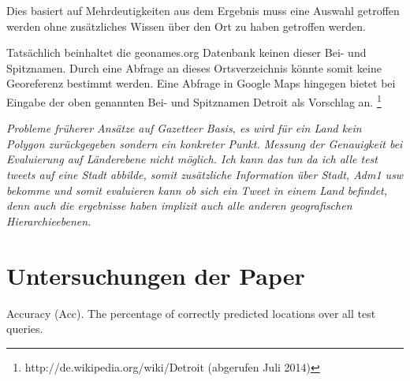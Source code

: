 		Dies basiert auf Mehrdeutigkeiten aus dem Ergebnis muss eine Auswahl getroffen werden ohne zusätzliches Wissen über den Ort zu haben getroffen werden.


		Tatsächlich beinhaltet die geonames.org Datenbank keinen dieser Bei- und Spitznamen.
		Durch eine Abfrage an dieses Ortsverzeichnis könnte somit keine Georeferenz bestimmt werden.
		Eine Abfrage in Google Maps hingegen bietet bei Eingabe der oben genannten Bei- und Spitznamen Detroit als Vorschlag an. \footnote{http://de.wikipedia.org/wiki/Detroit (abgerufen Juli 2014)} 


		\textit{Probleme früherer Ansätze auf Gazetteer Basis, es wird für ein Land kein Polygon zurückgegeben sondern ein konkreter Punkt. 
		Messung der Genauigkeit bei Evaluierung auf Länderebene nicht möglich.  
		Ich kann das tun da ich alle test tweets auf eine Stadt abbilde, somit zusätzliche Information über Stadt, Adm1 usw bekomme und somit evaluieren kann ob sich ein Tweet in einem Land befindet, denn auch die ergebnisse haben implizit auch alle anderen geografischen Hierarchieebenen.
		}








	\section{Untersuchungen der Paper}

		Accuracy (Acc). The percentage of correctly predicted locations over all test queries. 
	
